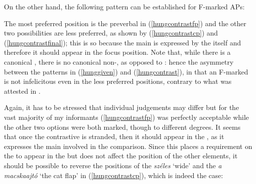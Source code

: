 On the other hand, the following pattern can be established for F-marked APs:

\ea \label{hungcontrast}
\z
\z

The most preferred position is the preverbal  in (\ref{hungcontrastfp}) and the other two possibilities are less preferred, as shown by (\ref{hungcontrastcp}) and (\ref{hungcontrastfinal}); this is so because the main  is expressed by the  itself and therefore it should appear in the focus position.  Note that, while there is a canonical , there is no canonical non-, as opposed to : hence the asymmetry between the patterns in (\ref{hunggiven}) and (\ref{hungcontrast}), in that an F-marked  is not infelicitous even in the less preferred positions, contrary to what was attested in .

Again, it has to be stressed that individual judgements may differ but for the vast majority of my informants (\ref{hungcontrastfp}) was perfectly acceptable while the other two options were both marked, though to different degrees. It seems that once the contrastive  is stranded, then it should appear in the , as it expresses the main  involved in the comparison. Since this places a requirement on the  to appear in the  but does not affect the position of the other elements, it should be possible to reverse the positions of the  \textit{széles} `wide' and the  \textit{a macskaajtó} `the cat flap' in (\ref{hungcontrastcp}), which is indeed the case:

